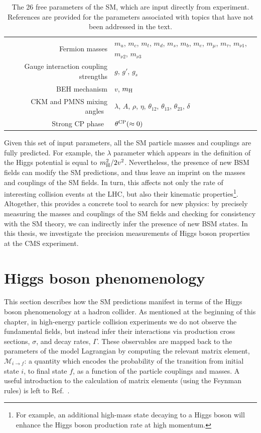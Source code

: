 \begin{table}
    \caption[The free parameters of the SM]{The 26 free parameters of the SM, which are input directly from experiment. References are provided for the parameters associated with topics that have not been addressed in the text.}
    \label{tab:sm_freeparams}
    \centering
    \footnotesize
    \renewcommand{\arraystretch}{2}
    \begin{tabular}{r|l}
        \hline
       Fermion masses & $m_u$, $m_c$, $m_t$, $m_d$, $m_s$, $m_b$, $m_e$, $m_\mu$, $m_\tau$, $m_{{\nu}1}$, $m_{{\nu}2}$, $m_{{\nu}3}$ \\
       Gauge interaction coupling strengths & $g$, $g'$, $g_s$ \\
       BEH mechanism & $v$, $m_{\rm{H}}$ \\
       CKM and PMNS mixing angles~\cite{Cabibbo:1963yz,Kobayashi:1973fv,Pontecorvo:1957qd,Maki:1962mu} & $\lambda$, $A$, $\rho$, $\eta$, $\theta_{12}$, $\theta_{13}$, $\theta_{23}$, $\delta$  \\
       Strong CP phase~\cite{strongcp} & $\theta^{\rm{CP}}(\approx0)$\\
       \hline
    \end{tabular}
\end{table}

Given this set of input parameters, all the SM particle masses and couplings are fully predicted. For example, the $\lambda$ parameter which appears in the definition of the Higgs potential is equal to $m_{\rm{H}}^2/2v^2$. Nevertheless, the presence of new BSM fields can modify the SM predictions, and thus leave an imprint on the masses and couplings of the SM fields. In turn, this affects not only the rate of interesting collision events at the LHC, but also their kinematic properties\footnote{For example, an additional high-mass state decaying to a Higgs boson will enhance the Higgs boson production rate at high momentum.}. Altogether, this provides a concrete tool to search for new physics: by precisely measuring the masses and couplings of the SM fields and checking for consistency with the SM theory, we can indirectly infer the presence of new BSM states. In this thesis, we investigate the precision measurements of Higgs boson properties at the CMS experiment.

\section{Higgs boson phenomenology}
This section describes how the SM predictions manifest in terms of the Higgs boson phenomenology at a hadron collider. As mentioned at the beginning of this chapter, in high-energy particle collision experiments we do not observe the fundamental fields, but instead infer their interactions via production cross sections, $\sigma$, and decay rates, $\Gamma$. These observables are mapped back to the parameters of the model Lagrangian by computing the relevant matrix element, $\mathcal{M}_{i \rightarrow f}$: a quantity which encodes the probability of the transition from initial state $i$, to final state $f$, as a function of the particle couplings and masses. A useful introduction to the calculation of matrix elements (using the Feynman rules) is left to Ref.~\cite{Thomson:2013zua}. 

